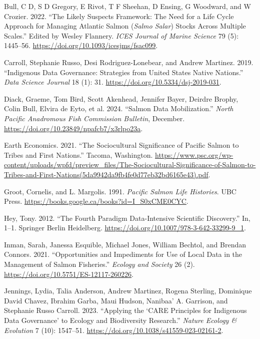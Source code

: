 \documentclass[
  letterpaper,
  DIV=11,
  numbers=noendperiod]{scrartcl}
\newlength{\cslhangindent}
\newenvironment{CSLReferences}[2] %
 {\begin{list}{}{%
  \setlength{\itemindent}{0pt}
  \setlength{\leftmargin}{0pt}
  \setlength{\parsep}{0pt}
  \ifodd #1
   \setlength{\leftmargin}{\cslhangindent}
   \setlength{\itemindent}{-1\cslhangindent}
  \fi
  \setlength{\itemsep}{#2\baselineskip}}}
 {\end{list}}
\begin{document}
\label{refs}
\begin{CSLReferences}{1}{0}
Bull, C D, S D Gregory, E Rivot, T F Sheehan, D Ensing, G Woodward, and
W Crozier. 2022. {``The Likely Suspects Framework: The Need for a Life
Cycle Approach for Managing Atlantic Salmon ({\emph{Salmo Salar}})
Stocks Across Multiple Scales.''} Edited by Wesley Flannery. \emph{ICES
Journal of Marine Science} 79 (5): 1445--56.
\url{https://doi.org/10.1093/icesjms/fsac099}.

Carroll, Stephanie Russo, Desi Rodriguez-Lonebear, and Andrew Martinez.
2019. {``Indigenous Data Governance: Strategies from United States
Native Nations.''} \emph{Data Science Journal} 18 (1): 31.
\url{https://doi.org/10.5334/dsj-2019-031}.

Diack, Graeme, Tom Bird, Scott Akenhead, Jennifer Bayer, Deirdre Brophy,
Colin Bull, Elvira de Eyto, et al. 2024. {``Salmon Data Mobilization.''}
\emph{North Pacific Anadromous Fish Commission Bulletin}, December.
\url{https://doi.org/10.23849/npafcb7/x3rlpo23a}.

Earth Economics. 2021. {``The Sociocultural Significance of Pacific
Salmon to Tribes and First Nations.''} Tacoma, Washington.
\url{https://www.psc.org/wp-content/uploads/wpfd/preview_files/The-Sociocultural-Significance-of-Salmon-to-Tribes-and-First-Nations(5da9942da9fb4fe0d77eb32bd6165e43).pdf}.

Groot, Cornelis, and L. Margolis. 1991. \emph{Pacific Salmon Life
Histories}. UBC Press.
\url{https://books.google.ca/books?id=I_S0xCME0CYC}.

Hey, Tony. 2012. {``The Fourth Paradigm {\textendash} Data-Intensive
Scientific Discovery.''} In, 1--1. Springer Berlin Heidelberg.
\url{https://doi.org/10.1007/978-3-642-33299-9_1}.

Inman, Sarah, Janessa Esquible, Michael Jones, William Bechtol, and
Brendan Connors. 2021. {``Opportunities and Impediments for Use of Local
Data in the Management of Salmon Fisheries.''} \emph{Ecology and
Society} 26 (2). \url{https://doi.org/10.5751/ES-12117-260226}.

Jennings, Lydia, Talia Anderson, Andrew Martinez, Rogena Sterling,
Dominique David Chavez, Ibrahim Garba, Maui Hudson, Nanibaa' A.
Garrison, and Stephanie Russo Carroll. 2023. {``Applying the {`}CARE
Principles for Indigenous Data Governance{'} to Ecology and Biodiversity
Research.''} \emph{Nature Ecology \& Evolution} 7 (10): 1547--51.
\url{https://doi.org/10.1038/s41559-023-02161-2}.


\end{CSLReferences}
\end{document}
